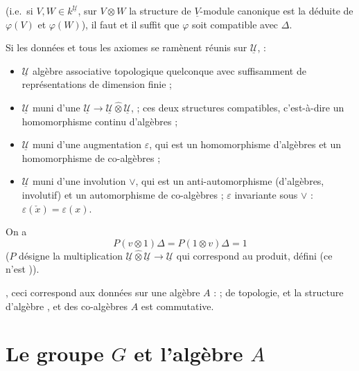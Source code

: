 \documentclass[11pt,a4paper]{article}
\begin{document}
 (i.e.\ si $V, W \in k^{\underline{\mathcal{U}}}$, \ill{} sur
$V \otimes W$ la structure de $\underline{V}$-module canonique est la \ill{}
\struck{\ill{}} déduite de $\varphi(V)$ et $\varphi(W)$), il faut et il suffit
que $\varphi$ soit compatible avec $\Delta$.


Si  les données et tous les axiomes se ramènent réunis sur
$\underline{\mathcal{U}}$, \struck{\ill{}} \ill{} :

\begin{itemize}
\item $\underline{\mathcal{U}}$ algèbre associative topologique quelconque
  \emph{\ill{}} avec suffisamment de représentations de dimension finie ;
\item $\underline{\mathcal{U}}$ muni d'une
  $\underline{\mathcal{U}} \to \underline{\mathcal{U}}
  \mathbin{\hat{\otimes}} \underline{\mathcal{U}}$,
   \ill{} ;
  ces deux structures compatibles, c'est-à-dire un homomorphisme continu
  d'algèbres ;
\item $\underline{\mathcal{U}}$ muni d'une augmentation $\varepsilon$, qui est
  un homomorphisme d'algèbres et un homomorphisme de co-algèbres ;
\item $\underline{\mathcal{U}}$ muni d'une involution $\vee$, qui est un
  anti-automorphisme (d'algèbres, involutif) et un automorphisme de
  co-algèbres ; $\varepsilon$ invariante sous $\vee$ :
  $\varepsilon(\check{x}) = \varepsilon(x)$.
\end{itemize}

On a
\[ P(v \otimes 1)\Delta = P(1 \otimes v)\Delta = 1 \]
($P$ désigne la multiplication $\underline{\mathcal{U}}
\mathbin{\hat{\otimes}} \underline{\mathcal{U}} \to \underline{\mathcal{U}}$ qui
correspond au produit, \struck{\ill{}}   défini \ill{} (ce n'est
\ill{})).

, ceci correspond aux données \ill{} sur une algèbre
$A$ : \ill{} ; \ill{} de topologie, et \ill{} la structure d'algèbre \ill{}, et
\ill{} des co-algèbres \ill{} $A$ est commutative.

\section*{Le groupe $G$ et l'algèbre $A$}
\end{document}
